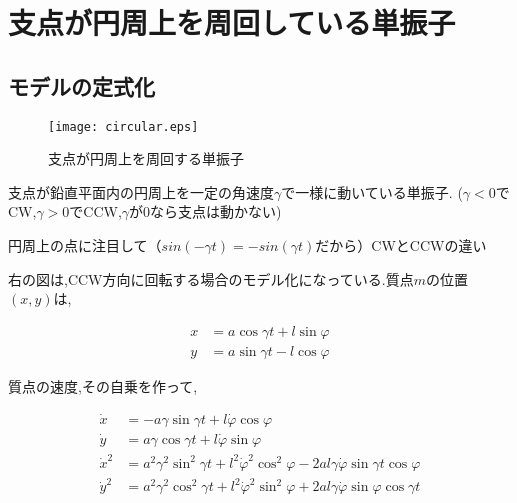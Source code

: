 \chapter{支点が円周上を周回している単振子}

\section{モデルの定式化}

    \begin{figure}[htbp]
        \begin{minipage}[b]{0.45\linewidth}
          \centering
          \texttt{[image: circular.eps]}
          \caption{支点が円周上を周回する単振子}
        \end{minipage}
      \end{figure}

支点が鉛直平面内の円周上を一定の角速度$\gamma$で一様に動いている単振子. ($\gamma<0$でCW,$\gamma>0$でCCW,$\gamma$が$0$なら支点は動かない)

円周上の点に注目して（$sin(-\gamma t)  = -sin(\gamma t)$だから）CWとCCWの違い

右の図は,CCW方向に回転する場合のモデル化になっている.質点$m$の位置$(x,y)$は,

\begin{align*}
   x&=a\cos\gamma t + l\sin\varphi\\
   y&=a\sin\gamma t - l\cos\varphi
\end{align*}

質点の速度,その自乗を作って,

\begin{align*}
   \dot{x}&=-a\gamma\sin\gamma t + l\dot{\varphi}\cos\varphi\\
   \dot{y}&=a\gamma\cos\gamma t + l\dot{\varphi}\sin\varphi\\
   \dot{x}^2&=a^2\gamma^2\sin^2\gamma t + l^2\dot{\varphi}^2\cos^2\varphi - 2al\gamma\dot{\varphi}\sin\gamma t\cos\varphi\\
   \dot{y}^2&=a^2\gamma^2\cos^2\gamma t + l^2\dot{\varphi}^2\sin^2\varphi + 2al\gamma\dot{\varphi}\sin\varphi\cos\gamma t
\end{align*}


